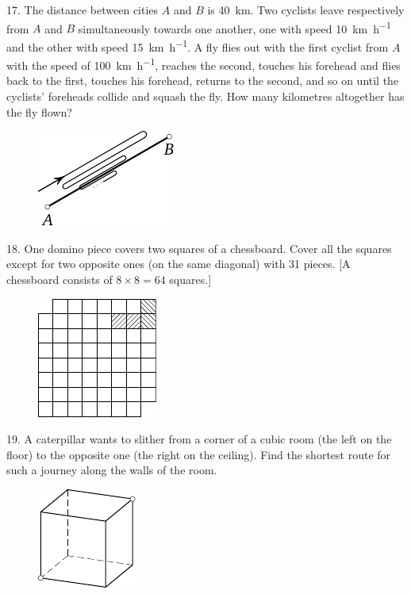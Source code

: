 \begin{problem}{17.}
	The distance between cities $A$ and $B$ is \SI{40}{\km}. Two cyclists leave respectively from $A$ and $B$ simultaneously
	towards one another, one with speed \SI{10}{\km\per\hour} and the other with speed \SI{15}{\km\per\hour}. A fly flies out with the first
	cyclist from $A$ with the speed of \SI{100}{\km\per\hour}, reaches the second, touches his forehead and flies back to the first,
	touches his forehead, returns to the second, and so on until the cyclists' foreheads collide and squash
	the fly.
	How many kilometres altogether has the fly flown?
	\begin{figure}
		\includegraphics{resources/taskbook-1}
	\end{figure}
\end{problem}

\begin{problem}{18.}
	One domino piece covers two squares of a chessboard.
	Cover all the squares
	except for two opposite ones (on the same diagonal) with 31 pieces. [A chessboard consists of $8 \times 8 = 64$ squares.]
	\begin{figure}
		\includegraphics{resources/taskbook-2}
	\end{figure}
\end{problem}

\begin{problem}{19.}
	A caterpillar wants to slither from a corner of a cubic room (the left on the floor) to the opposite one
	(the right on the ceiling).
	Find the shortest route for such a journey along the walls of the room.
	\begin{figure}
		\includegraphics{resources/taskbook-3}
	\end{figure}
\end{problem}

